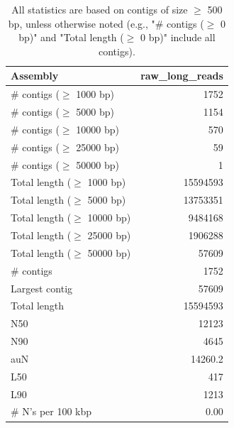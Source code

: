 \documentclass[12pt,a4paper]{article}
\begin{document}
\begin{table}[ht]
\begin{center}
\caption{All statistics are based on contigs of size $\geq$ 500 bp, unless otherwise noted (e.g., "\# contigs ($\geq$ 0 bp)" and "Total length ($\geq$ 0 bp)" include all contigs).}
\begin{tabular}{|l*{1}{|r}|}
\hline
Assembly & raw\_long\_reads \\ \hline
\# contigs ($\geq$ 1000 bp) & 1752 \\ \hline
\# contigs ($\geq$ 5000 bp) & 1154 \\ \hline
\# contigs ($\geq$ 10000 bp) & 570 \\ \hline
\# contigs ($\geq$ 25000 bp) & 59 \\ \hline
\# contigs ($\geq$ 50000 bp) & 1 \\ \hline
Total length ($\geq$ 1000 bp) & 15594593 \\ \hline
Total length ($\geq$ 5000 bp) & 13753351 \\ \hline
Total length ($\geq$ 10000 bp) & 9484168 \\ \hline
Total length ($\geq$ 25000 bp) & 1906288 \\ \hline
Total length ($\geq$ 50000 bp) & 57609 \\ \hline
\# contigs & 1752 \\ \hline
Largest contig & 57609 \\ \hline
Total length & 15594593 \\ \hline
N50 & 12123 \\ \hline
N90 & 4645 \\ \hline
auN & 14260.2 \\ \hline
L50 & 417 \\ \hline
L90 & 1213 \\ \hline
\# N's per 100 kbp & 0.00 \\ \hline
\end{tabular}
\end{center}
\end{table}
\end{document}
